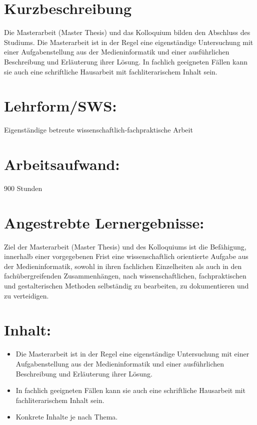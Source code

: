 \section*{Kurzbeschreibung}\label{kurzbeschreibung}

Die Masterarbeit (Master Thesis) und das Kolloquium bilden den Abschluss
des Studiums. Die Masterarbeit ist in der Regel eine eigenständige
Untersuchung mit einer Aufgabenstellung aus der Medieninformatik und
einer ausführlichen Beschreibung und Erläuterung ihrer Lösung. In
fachlich geeigneten Fällen kann sie auch eine schriftliche Hausarbeit
mit fachliterarischem Inhalt sein.

\section*{Lehrform/SWS:}\label{lehrformsws-1}

Eigenständige betreute wissenschaftlich-fachpraktische Arbeit

\section*{Arbeitsaufwand:}\label{arbeitsaufwand-1}

900 Stunden

\section*{Angestrebte
Lernergebnisse:}\label{angestrebte-lernergebnisse-1}

Ziel der Masterarbeit (Master Thesis) und des Kolloquiums ist die
Befähigung, innerhalb einer vorgegebenen Frist eine wissenschaftlich
orientierte Aufgabe aus der Medieninformatik, sowohl in ihren fachlichen
Einzelheiten als auch in den fachübergreifenden Zusammenhängen, nach
wissenschaftlichen, fachpraktischen und gestalterischen Methoden
selbständig zu bearbeiten, zu dokumentieren und zu verteidigen.

\section*{Inhalt:}\label{inhalt-1}

\begin{itemize}
\item
  Die Masterarbeit ist in der Regel eine eigenständige Untersuchung mit
  einer Aufgabenstellung aus der Medieninformatik und einer
  ausführlichen Beschreibung und Erläuterung ihrer Lösung.
\item
  In fachlich geeigneten Fällen kann sie auch eine schriftliche
  Hausarbeit mit fachliterarischem Inhalt sein.
\item
  Konkrete Inhalte je nach Thema.
\end{itemize}

